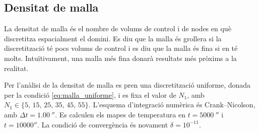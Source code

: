 
\subsection{Densitat de malla}

La densitat de malla és el nombre de volums de control i de nodes en què discretitza espacialment el domini. Es diu que la malla és grollera si la discretització té pocs volums de control i es diu que la malla és fina si en té molts. Intuïtivament, una malla més fina donarà resultats més pròxims a la realitat.

Per l'anàlisi de la densitat de malla es pren una discretització uniforme, donada per la condició \eqref{eq:malla_uniforme}, i es fixa el valor de $N_1$, amb $N_1 \in \{ 5, \, 15, \, 25, \, 35, \, 45, \, 55\}$. L'esquema d'integració numèrica és Crank--Nicolson, amb $\Delta t = 1.00 \ \second$. Es calculen els mapes de temperatura en $t = 5000 \ \second$ i $t = 10000 \second$. La condició de convergència és novament $\delta = 10^{-11}$. 

